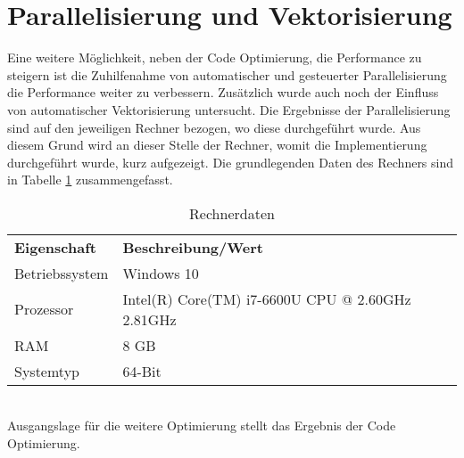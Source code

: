 \section{Parallelisierung und Vektorisierung}
Eine weitere Möglichkeit, neben der Code Optimierung, die Performance zu steigern ist die Zuhilfenahme von automatischer und gesteuerter Parallelisierung \cite{Kessler.Wintersemester201718}  die Performance weiter zu verbessern. Zusätzlich wurde auch noch der Einfluss von automatischer Vektorisierung untersucht. Die Ergebnisse der Parallelisierung sind auf den jeweiligen Rechner bezogen, wo diese durchgeführt wurde. Aus diesem Grund wird an dieser Stelle der Rechner, womit die Implementierung durchgeführt wurde, kurz aufgezeigt. Die grundlegenden Daten des Rechners sind in Tabelle \ref{tab:Rechnerdaten} zusammengefasst.
\begin{table}[h]
	\centering	\begin{tabular}{l p{10cm}}
		\textbf{Eigenschaft} & \textbf{Beschreibung/Wert}\\
		Betriebssystem & Windows 10\\
		Prozessor & Intel(R) Core(TM) i7-6600U CPU @ 2.60GHz 2.81GHz\\
		RAM & 8 GB\\
		Systemtyp & 64-Bit 
	\end{tabular}
	\caption{Rechnerdaten}
	\label{tab:Rechnerdaten}
\end{table}\\
Ausgangslage für die weitere Optimierung stellt das Ergebnis der Code Optimierung.
